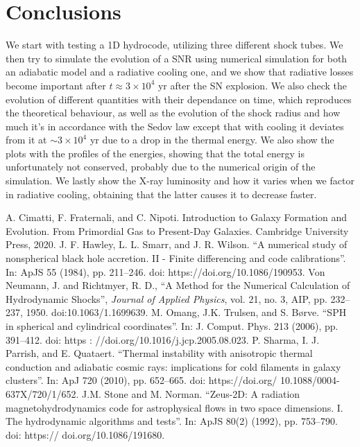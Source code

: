 \documentclass{article}
\begin{document}
\section*{Conclusions}
We start with testing a 1D hydrocode, utilizing three different shock tubes. We then try to simulate the evolution of a SNR using numerical simulation for both an adiabatic model and a radiative cooling one, and we show that radiative losses become important after $t\approx 3\times 10^4$ yr after the SN explosion. We also check the evolution of different quantities with their dependance on time, which reproduces the theoretical behaviour, as well as the evolution of the shock radius and how much it's in accordance with the Sedov law except that with cooling it deviates from it at $\sim 3\times 10^4$ yr due to a drop in the thermal energy. We also show the plots with the profiles of the energies, showing that the total energy is unfortunately not conserved, probably due to the numerical origin of the simulation. We lastly show the X-ray luminosity and how it varies when we factor in radiative cooling, obtaining that the latter causes it to decrease faster. 
\begin{thebibliography}{6}
	A. Cimatti, F. Fraternali, and C. Nipoti. Introduction to Galaxy Formation and Evolution.
From Primordial Gas to Present-Day Galaxies. Cambridge University Press, 2020.
	J. F. Hawley, L. L. Smarr, and J. R. Wilson. “A numerical study of nonspherical
black hole accretion. II - Finite differencing and code calibrations”. In: ApJS
55 (1984), pp. 211–246. doi: https://doi.org/10.1086/190953.
Von Neumann, J. and Richtmyer, R. D., “A Method for the Numerical Calculation of Hydrodynamic Shocks”, \textit{Journal of Applied Physics}, vol. 21, no. 3, AIP, pp. 232–237, 1950. doi:10.1063/1.1699639.
M. Omang, J.K. Trulsen, and S. Børve. “SPH in spherical and cylindrical
coordinates”. In: J. Comput. Phys. 213 (2006), pp. 391–412. doi: https :
//doi.org/10.1016/j.jcp.2005.08.023.
P. Sharma, I. J. Parrish, and E. Quataert. “Thermal instability with anisotropic
thermal conduction and adiabatic cosmic rays: implications for cold filaments
in galaxy clusters”. In: ApJ 720 (2010), pp. 652–665. doi: https://doi.org/
10.1088/0004-637X/720/1/652.
J.M. Stone and M. Norman. “Zeus-2D: A radiation magnetohydrodynamics
code for astrophysical flows in two space dimensions. I. The hydrodynamic
algorithms and tests”. In: ApJS 80(2) (1992), pp. 753–790. doi: https://
doi.org/10.1086/191680.
\end{thebibliography}
\end{document}
